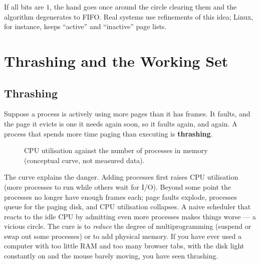 \documentclass[11pt,a4paper]{article}
\newcommand{\term}[1]{\textbf{\color{mintdeep}#1}}
\begin{document}
If all bits are $1$, the hand goes once around the circle clearing them and the algorithm degenerates to FIFO. Real systems use refinements of this idea; Linux, for instance, keeps ``active'' and ``inactive'' page lists.

\section{Thrashing and the Working Set}

\subsection{Thrashing}

Suppose a process is actively using more pages than it has frames. It faults, and the page it evicts is one it needs again soon, so it faults again, and again. A process that spends more time paging than executing is \term{thrashing}.

\begin{figure}[H]
\centering
{}
\caption{CPU utilisation against the number of processes in memory (conceptual curve, not measured data).}
\end{figure}

The curve explains the danger. Adding processes first raises CPU utilisation (more processes to run while others wait for I/O). Beyond some point the processes no longer have enough frames each; page faults explode, processes queue for the paging disk, and CPU utilisation collapses. A naive scheduler that reacts to the idle CPU by admitting even more processes makes things worse --- a vicious circle. The cure is to \emph{reduce} the degree of multiprogramming (suspend or swap out some processes) or to add physical memory. If you have ever used a computer with too little RAM and too many browser tabs, with the disk light constantly on and the mouse barely moving, you have seen thrashing.
\end{document}
